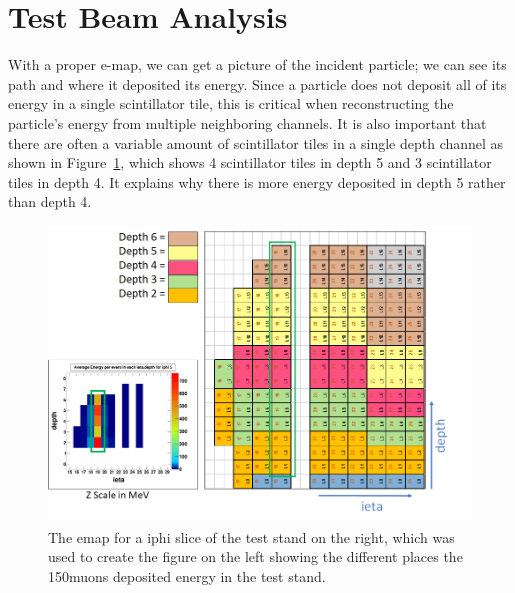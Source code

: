 \section{Test Beam Analysis}

With a proper e-map, we can get a picture of the incident particle; we can see its path and where it deposited its energy. Since a particle does not deposit all of its energy in a single scintillator tile, this is critical when reconstructing the particle's energy from multiple neighboring channels. It is also important that there are often a variable amount of scintillator tiles in a single depth channel as shown in Figure~\ref{fig:emap}, which shows 4 scintillator tiles in depth 5 and 3 scintillator tiles in depth 4. It explains why there is more energy deposited in depth 5 rather than depth 4. 

\begin{figure}
\centering
\includegraphics[width=\linewidth]{Figures/eplot.png}
\caption{The emap for a iphi slice of the test stand on the right, which was used to create the figure on the left showing the different places the 150\GeV\space muons deposited energy in the test stand.}
\label{fig:emap}
\end{figure}

